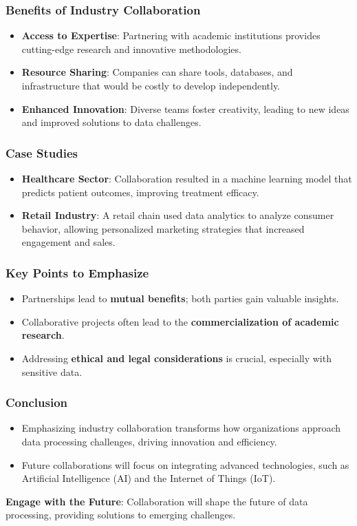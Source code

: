 \documentclass{beamer}
\begin{document}
\begin{frame}[fragile]
    \frametitle{Benefits of Industry Collaboration}
    \begin{itemize}
        \item \textbf{Access to Expertise}: Partnering with academic institutions provides cutting-edge research and innovative methodologies.
        \item \textbf{Resource Sharing}: Companies can share tools, databases, and infrastructure that would be costly to develop independently.
        \item \textbf{Enhanced Innovation}: Diverse teams foster creativity, leading to new ideas and improved solutions to data challenges.
    \end{itemize}
\end{frame}

\begin{frame}[fragile]
    \frametitle{Case Studies}
    \begin{itemize}
        \item \textbf{Healthcare Sector}: Collaboration resulted in a machine learning model that predicts patient outcomes, improving treatment efficacy.
        \item \textbf{Retail Industry}: A retail chain used data analytics to analyze consumer behavior, allowing personalized marketing strategies that increased engagement and sales.
    \end{itemize}
\end{frame}

\begin{frame}[fragile]
    \frametitle{Key Points to Emphasize}
    \begin{itemize}
        \item Partnerships lead to \textbf{mutual benefits}; both parties gain valuable insights.
        \item Collaborative projects often lead to the \textbf{commercialization of academic research}.
        \item Addressing \textbf{ethical and legal considerations} is crucial, especially with sensitive data.
    \end{itemize}
\end{frame}

\begin{frame}[fragile]
    \frametitle{Conclusion}
    \begin{itemize}
        \item Emphasizing industry collaboration transforms how organizations approach data processing challenges, driving innovation and efficiency.
        \item Future collaborations will focus on integrating advanced technologies, such as Artificial Intelligence (AI) and the Internet of Things (IoT).
    \end{itemize}
    \textbf{Engage with the Future}: Collaboration will shape the future of data processing, providing solutions to emerging challenges.
\end{frame}
\end{document}

